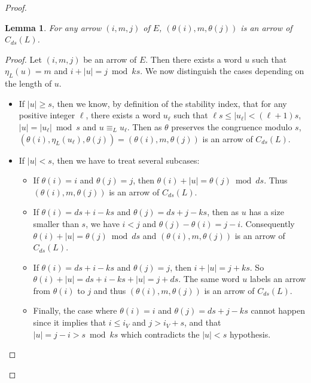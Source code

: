 \documentclass[submission,hidelink]{dmtcs-episciences}
\newtheorem{lemma}[theorem]{Lemma}
\renewcommand{\leq}{\leqslant}
\renewcommand{\geq}{\geqslant}
\begin{document}
\begin{proof}
		\begin{lemma}\label{lemma:theta_arrow}
		For any arrow $(i,m,j)$ of $E$, $(\theta(i),m,\theta(j))$ is an arrow of $C_{ds}(L)$.
		\end{lemma}
		\begin{proof}
		Let $(i,m,j)$ be an arrow of $E$. Then there exists a word $u$ such that
		$\eta_L(u)=m$ and $i+|u|=j \bmod{ks}$.
		We now distinguish the cases depending on the length of $u$.
		\begin{itemize}
		\item If $|u|\geq s$, then we know, by definition of the stability index, that for any positive integer $\ell$, there exists a word $u_\ell$ such that
		$\ell s\leq |u_\ell| <(\ell+1)s$, $|u|=|u_\ell|\bmod s$ and $u\equiv_L u_\ell$.
		Then as $\theta$ preserves the congruence modulo $s$,
		$(\theta(i),\eta_L(u_\ell),\theta(j))=(\theta(i),m,\theta(j))$
		is an arrow of $C_{ds}(L)$.
		\item If $|u|<s$, then we have to treat several subcases:
			\begin{itemize}
				\item If $\theta(i)=i$ and $\theta(j)=j$, then $\theta(i)+|u|=\theta(j)\bmod{ds}$.
				Thus $(\theta(i),m,\theta(j))$ is an arrow of $C_{ds}(L)$.
				\item If $\theta(i)=ds+i-{ks}$ and $\theta(j)=ds+j-{ks}$,
		 then as $u$ has a size smaller than $s$, we have $i<j$ and $\theta(j)-\theta(i)=j-i$. Consequently $\theta(i)+|u|=\theta(j)\bmod{ds}$ and
		  		$(\theta(i),m,\theta(j))$ is an arrow of $C_{ds}(L)$.
		  		\item If $\theta(i)=ds+i-{ks}$ and $\theta(j)=j$, then
		  		$i+|u|=j+{ks}$.
		  		So  $\theta(i)+|u|= ds+i-{ks} +|u|=j+ds$.
		  		The same word $u$ labels an arrow from $\theta(i)$ to $j$ and thus
		  		$(\theta(i),m,\theta(j))$ is an arrow of $C_{ds}(L)$.
		  		\item Finally, the case where  $\theta(i)=i$ and $\theta(j)=ds+j-{ks}$ cannot happen since
		  		it implies that $i\leq i_V$ and $j>i_V+s$, and that
		  		$|u|=j-i> s \bmod{ks}$ which contradicts the $|u|<s$ hypothesis.

			\end{itemize}
		\end{itemize}
		\end{proof}


\end{proof}
\end{document}
